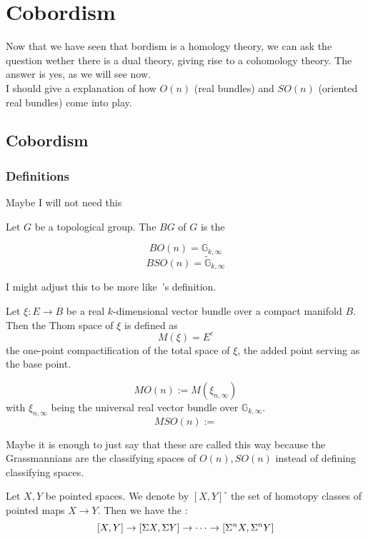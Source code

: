 \documentclass[a4paper,11pt]{article}
\begin{document}
\section{Cobordism}
Now that we have seen that bordism is a homology theory, we can ask the question wether there is a dual theory, giving rise to a cohomology theory. The answer is yes, as we will see now.\\
I should give a explanation of how \(O(n)\) (real bundles) and \(SO(n)\) (oriented real bundles) come into play.

\subsection{Cobordism}

\subsubsection{Definitions}

Maybe I will not need this
\begin{definition}
    Let \(G\) be a topological group. The  \(BG\) of \(G\) is the 
\end{definition}

\begin{observation}
    \[BO(n)=\mathbb{G}_{k,\infty}\]
    \[BSO(n)=\widetilde{\mathbb{G}}_{k,\infty}\]
\end{observation}

I might adjust this to be more like\ \cite{thom}'s definition.
\begin{definition}
    Let \(\xi:E\to B\) be a real \(k\)-dimensional vector bundle over a compact manifold \(B\).
    Then the Thom space of \(\xi\) is defined as\[M(\xi)=E^c\] the one-point compactification of the total space of \(\xi\), the added point serving as the base point.
\end{definition}

\begin{definition}
    \[MO(n):=M(\xi_{n,\infty})\] with \(\xi_{n,\infty}\) being the universal real vector bundle over \(\mathbb{G}_{k,\infty}\).
    \[MSO(n):=  \]
\end{definition}
Maybe it is enough to just say that these are called this way because the Grassmannians are the classifying spaces of \(O(n), SO(n)\) instead of defining classifying spaces.

\begin{theorem}\label{suspension}
    Let \(X, Y\) be pointed spaces. We denote by \({[X,Y]}^\circ\) the set of homotopy classes of pointed maps \(X\to Y\). Then we have the :
    \[[X,Y]\to[\Sigma{X},\Sigma{Y}]\to\dots\to[\Sigma^n{X},\Sigma^n{Y}]\] 
\end{theorem}
\end{document}
